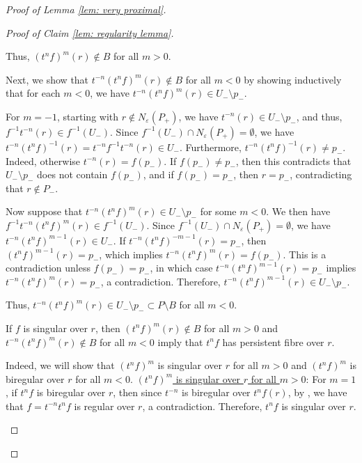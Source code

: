 \documentclass[12pt]{article}
\newcommand{\vs}{\vskip10pt}
\theoremstyle{definition}
\newcommand{\ve}{\varepsilon}
\begin{document}
\begin{proof} [Proof of Lemma \ref{lem: very proximal}]
\begin{proof}[Proof of Claim \ref{lem: regularity lemma}]
\begin{enumerate}
        Thus, $(t^nf)^m(r) \notin B$ for all $m > 0$. 

        Next, we show that $t^{-n}(t^nf)^m (r) \notin B$ for all $m <0$ by showing inductively that for each $m < 0$, we have $t^{-n} (t^n f)^m (r) \in U_- \setminus p_-$. 

        For $m = -1$, starting with $r \notin N_{\ve}(P_+)$, we have $t^{-n} (r) \in U_- \setminus p_-$, and thus, $f^{-1}t^{-n} (r) \in f^{-1}(U_-)$. Since $f^{-1}(U_-) \cap N_{\ve}(P_+) = \emptyset$, we have $t^{-n}(t^n f)^{-1}(r) = t^{-n}f^{-1}t^{-n}(r) \in U_-$. Furthermore, $t^{-n}(t^n f)^{-1}(r) \neq p_-$. Indeed, otherwise $t^{-n}(r) = f(p_-)$. If $f(p_-) \neq p_-$, then this contradicts that $U_- \setminus p_-$ does not contain $f(p_-)$, and if $f(p_-) = p_-$, then $r = p_-$, contradicting that $r \notin P_-$. 

        Now suppose that $t^{-n}(t^n f)^m (r) \in U_- \setminus p_-$ for some $m < 0$. We then have $f^{-1}t^{-n}(t^n f)^m (r) \in f^{-1}(U_-)$. Since $f^{-1}(U_-) \cap N_{\ve}(P_+) = \emptyset$, we have $t^{-n}(t^n f)^{m-1}(r) \in U_-$. If $t^{-n}(t^n f)^{-m-1}(r) = p_-$, then $(t^n f)^{m-1}(r) = p_-$, which implies $t^{-n} (t^n f)^m (r) = f(p_-)$. This is a contradiction unless $f(p_-) = p_-$, in which case $t^{-n}(t^n f)^{m-1}(r) = p_-$ implies $t^{-n}(t^n f)^{m}(r) = p_-$, a contradiction. Therefore, $t^{-n}(t^n f)^{m-1}(r) \in U_- \setminus p_-$. 

        Thus, $t^{-n}(t^nf)^m(r) \in U_- \setminus p_- \subset P \setminus B$ for all $m < 0$.

        If $f$ is singular over $r$, then $(t^nf)^m(r) \notin B$ for all $m > 0$ and $t^{-n}(t^nf)^m(r) \notin B$ for all $m < 0$ imply that $t^n f$ has persistent fibre over $r$. 

        Indeed, we will show that $(t^n f)^m$ is singular over $r$ for all $m > 0$ and $(t^n f)^m$ is biregular over $r$ for all $m < 0$. 
        \vs
        \underline{$(t^n f)^m$ is singular over $r$ for all $m > 0$}: 
        \vs
        For $m = 1$, if $t^n f$ is biregular over $r$, then since $t^{-n}$ is biregular over $t^n f(r)$, by \cite[Remark 4.4]{Algebraic}, we have that $f = t^{-n} t^n f$ is regular over $r$, a contradiction. Therefore, $t^n f$ is singular over $r$. 


\end{enumerate}
\end{proof}
\end{proof}
\end{document}
